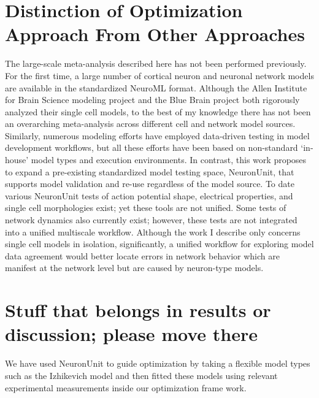 
\section{Distinction of Optimization Approach From Other Approaches}
The large-scale meta-analysis described here has not been performed previously. For the first time, a large number of cortical neuron and neuronal network models are available in the standardized NeuroML format. Although the Allen Institute for Brain Science modeling project and the Blue Brain project both rigorously analyzed their single cell models, to the best of my knowledge there has not been an overarching meta-analysis across different cell and network model sources.\\

Similarly, numerous modeling efforts have employed data-driven testing in model development workflows, but all these efforts have been based on non-standard ‘in-house’ model types and execution environments. In contrast, this work proposes to expand a pre-existing standardized model testing space, NeuronUnit, that supports model validation and re-use regardless of the model source. To date various NeuronUnit tests of action potential shape, electrical properties, and single cell morphologies exist; yet these tools are not unified. Some tests of network dynamics also currently exist; however, these tests are not integrated into a unified multiscale workflow. Although the work I describe only concerns single cell models in isolation, significantly, a unified workflow for exploring model data agreement would better locate errors in network behavior which are manifest at the network level but are caused by neuron-type models.

\section{Stuff that belongs in results or discussion; please move there}%
We have used NeuronUnit to guide optimization by taking a flexible model types such as the Izhikevich model and then fitted these models using relevant experimental measurements inside our optimization frame work.

